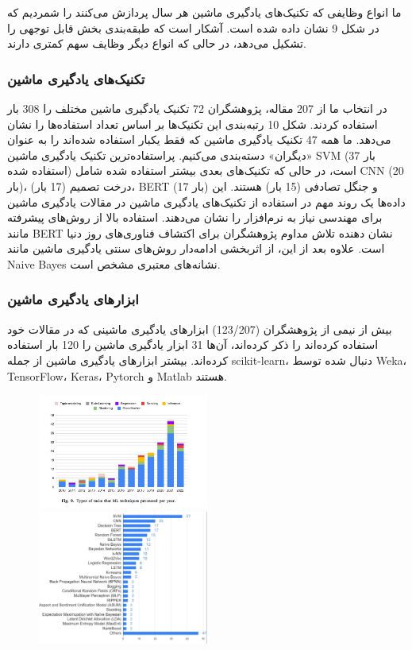 \documentclass[a4paper,10pt]{article}
\begin{document}
                ما انواع وظایفی که تکنیک‌های یادگیری ماشین هر سال پردازش می‌کنند را شمردیم که در شکل 9 نشان داده شده است. آشکار است که طبقه‌بندی بخش قابل توجهی را تشکیل می‌دهد، در حالی که انواع دیگر وظایف سهم کمتری دارند.

            \subsubsection{تکنیک‌های یادگیری ماشین}

                در انتخاب ما از 207 مقاله، پژوهشگران 72 تکنیک یادگیری ماشین مختلف را 308 بار استفاده کردند. شکل 10 رتبه‌بندی این تکنیک‌ها بر اساس تعداد استفاده‌ها را نشان می‌دهد. ما همه 47 تکنیک یادگیری ماشین که فقط یکبار استفاده شده‌اند را به عنوان «دیگران» دسته‌بندی می‌کنیم. پراستفاده‌ترین تکنیک یادگیری ماشین SVM (37 بار استفاده شده) است، در حالی که تکنیک‌های بعدی بیشتر استفاده شده شامل CNN (20 بار)، درخت تصمیم (17 بار)، BERT (17 بار) و جنگل تصادفی (15 بار) هستند. این داده‌ها یک روند مهم در استفاده از تکنیک‌های یادگیری ماشین در مقالات یادگیری ماشین برای مهندسی نیاز به نرم‌افزار را نشان می‌دهند. استفاده بالا از روش‌های پیشرفته مانند BERT نشان دهنده تلاش مداوم پژوهشگران برای اکتشاف فناوری‌های روز دنیا است. علاوه بعد از این، از اثربخشی ادامه‌دار روش‌های سنتی یادگیری ماشین مانند Naive Bayes نشانه‌های معتبری مشخص است.
            
            \subsubsection{ابزارهای یادگیری ماشین}

                بیش از نیمی از پژوهشگران (123/207) ابزارهای یادگیری ماشینی که در مقالات خود استفاده کرده‌اند را ذکر کرده‌اند، آن‌ها 31 ابزار یادگیری ماشین را 120 بار استفاده کرده‌اند. بیشتر ابزارهای یادگیری ماشین از جمله scikit-learn، دنبال شده توسط Weka، TensorFlow، Keras، Pytorch و Matlab هستند.

                \begin{figure}
                    \centering
                    \includegraphics[width=0.5\textwidth]{Image/fig-9.jpg}
                    \includegraphics[width=0.5\textwidth]{Image/fig-10.jpg}
                \end{figure}
            
\end{document}
